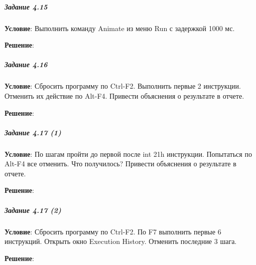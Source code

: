 \subparagraph{Задание 4.15}

\textbf{Условие}:
Выполнить команду Animate из меню Run с задержкой 1000 мс.

\textbf{Решение}:



\subparagraph{Задание 4.16}

\textbf{Условие}:
Сбросить программу по Ctrl-F2. Выполнить первые 2 инструкции. Отменить их действие по Alt-F4. Привести объяснения о результате в отчете.

\textbf{Решение}:



\subparagraph{Задание 4.17 (1)}

\textbf{Условие}:
По шагам пройти до первой после int 21h инструкции. Попытаться по Alt-F4 все отменить. Что получилось? Привести объяснения о результате в отчете.

\textbf{Решение}:



\subparagraph{Задание 4.17 (2)}

\textbf{Условие}:
Сбросить программу по Ctrl-F2. По F7 выполнить первые 6 инструкций. Открыть окно Execution History. Отменить последние 3 шага.

\textbf{Решение}:



